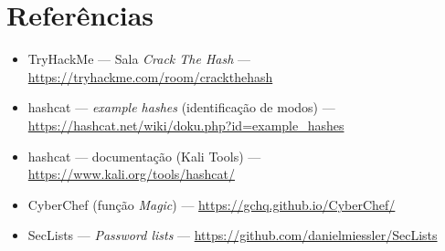 \documentclass[12pt,a4paper]{article}
\begin{document}
\section{Referências}
\begin{itemize}[leftmargin=1.5em]
  \item TryHackMe --- Sala \emph{Crack The Hash} ---
        \url{https://tryhackme.com/room/crackthehash}
  \item hashcat --- \emph{example hashes} (identificação de modos) ---
        \url{https://hashcat.net/wiki/doku.php?id=example_hashes}
  \item hashcat --- documentação (Kali Tools) ---
        \url{https://www.kali.org/tools/hashcat/}
  \item CyberChef (função \emph{Magic}) ---
        \url{https://gchq.github.io/CyberChef/}
  \item SecLists --- \emph{Password lists} ---
        \url{https://github.com/danielmiessler/SecLists}
\end{itemize}
\end{document}
